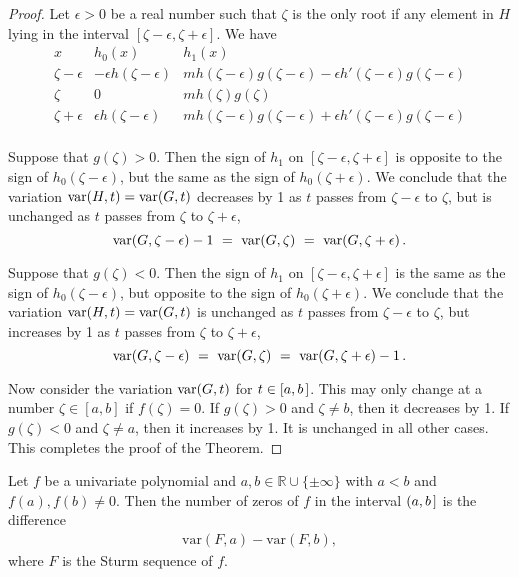 \documentclass[12pt]{amsart}
\theoremstyle{definition}
\DeclareMathOperator{\var}{{\rm var}}
\begin{document}
\begin{proof}
 Let $\epsilon>0$ be a real number such that $\zeta$ is the only root if any element in $H$ lying in the interval
 $[\zeta-\epsilon,\zeta+\epsilon]$.
 We have
 \[
 \begin{array}{c|c|l}
   x & h_0(x) & h_1(x)\\\hline
   \zeta-\epsilon & -\epsilon h(\zeta-\epsilon)  & mh(\zeta-\epsilon)g(\zeta-\epsilon) - \epsilon h'(\zeta-\epsilon)g(\zeta-\epsilon)\\
   \zeta     &     0    &   mh(\zeta)g(\zeta)\\
   \zeta+\epsilon & \epsilon h(\zeta-\epsilon)  & mh(\zeta-\epsilon)g(\zeta-\epsilon) + \epsilon h'(\zeta-\epsilon)g(\zeta-\epsilon)\\
 \end{array}
 \]

 Suppose that $g(\zeta)>0$.
 Then the sign of $h_1$ on $[\zeta-\epsilon,\zeta+\epsilon]$ is opposite to the sign of $h_0(\zeta-\epsilon)$, but the same as the sign of
 $h_0(\zeta+\epsilon)$.
 We conclude that the variation $\var(H,t)=\var(G,t)$ decreases by 1 as $t$ passes from $\zeta-\epsilon$ to $\zeta$, but is unchanged as $t$
 passes from $\zeta$ to $\zeta+\epsilon$,
 \[
 \var(G,\zeta-\epsilon)-1\ =\ \var(G,\zeta)\ =\ \var(G,\zeta+\epsilon)\,.
 \]
  

 Suppose that $g(\zeta)<0$.
 Then the sign of $h_1$ on $[\zeta-\epsilon,\zeta+\epsilon]$ is the same as the sign of $h_0(\zeta-\epsilon)$, but opposite to the sign of
 $h_0(\zeta+\epsilon)$.
 We conclude that the variation $\var(H,t)=\var(G,t)$ is unchanged as $t$ passes from $\zeta-\epsilon$ to $\zeta$, but increases by 1 as $t$ 
 passes from $\zeta$ to $\zeta+\epsilon$,
 \[
   \var(G,\zeta-\epsilon)\ =\ \var(G,\zeta)\ =\ \var(G,\zeta+\epsilon)-1\,.
 \]

 Now consider the variation $\var(G,t)$ for $t\in[a,b\hspace{.05cm}]$.
 This may only change at a number $\zeta\in[a,b]$ if $f(\zeta)=0$.
 If $g(\zeta)>0$ and $\zeta\neq b$, then it decreases by 1.
 If $g(\zeta)<0$ and $\zeta\neq a$, then it increases by 1.
 It is unchanged in all other cases.
 This completes the proof of the Theorem.  
 \end{proof}


Let $f$ be a univariate polynomial and $a,b\in \mathbb{R}\cup\{\pm\infty\}$ with $a<b$ and $f(a),f(b)\neq 0$. Then the number of zeros of $f$ in the interval $(a,b\hspace{.05cm}]$ is the difference 
\begin{align*}
\text{var}(F,a) - \text{var}(F,b),
\end{align*}
where $F$ is the Sturm sequence of $f$.
\end{document}
